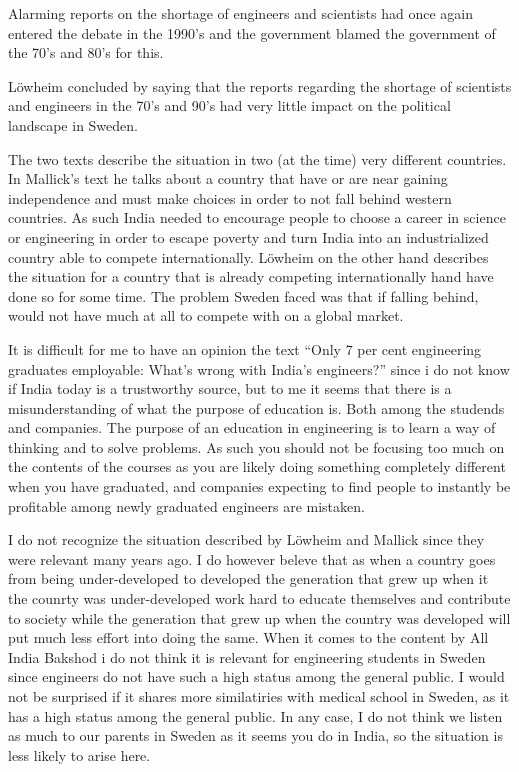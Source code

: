\documentclass[12pt,a4paper]{IEEEtran}
\begin{document}
Alarming reports on the shortage of engineers and scientists had once again entered the debate in the 1990's and the government blamed the government of the 70's and 80's for this.

Löwheim concluded by saying that the reports regarding the shortage of scientists and engineers in the 70's and 90's had very little impact on the political landscape in Sweden.

\noindent The two texts describe the situation in two (at the time) very different countries.
In Mallick's text he talks about a country that have or are near gaining independence and must make choices in order to not fall behind western countries.
As such India needed to encourage people to choose a career in science or engineering in order to escape poverty and turn India into an industrialized country able to compete internationally.
Löwheim on the other hand describes the situation for a country that is already competing internationally hand have done so for some time.
The problem Sweden faced was that if falling behind, would not have much at all to compete with on a global market.

\noindent It is difficult for me to have an opinion the text ``Only 7 per cent engineering graduates employable: What's wrong with India's engineers?'' since i do not know if India today is a trustworthy source, but to me it seems that there is a misunderstanding of what the purpose of education is.
Both among the studends and companies.
The purpose of an education in engineering is to learn a way of thinking and to solve problems.
As such you should not be focusing too much on the contents of the courses as you are likely doing something completely different when you have graduated, and companies expecting to find people to instantly be profitable among newly graduated engineers are mistaken.

\noindent I do not recognize the situation described by Löwheim and Mallick since they were relevant many years ago.
I do however beleve that as when a country goes from being under-developed to developed the generation that grew up when it the counrty was under-developed work hard to educate themselves and contribute to society while the generation that grew up when the country was developed will put much less effort into doing the same.
When it comes to the content by All India Bakshod i do not think it is relevant for engineering students in Sweden since engineers do not have such a high status among the general public.
I would not be surprised if it shares more similatiries with medical school in Sweden, as it has a high status among the general public.
In any case, I do not think we listen as much to our parents in Sweden as it seems you do in India, so the situation is less likely to arise here.
\end{document}
